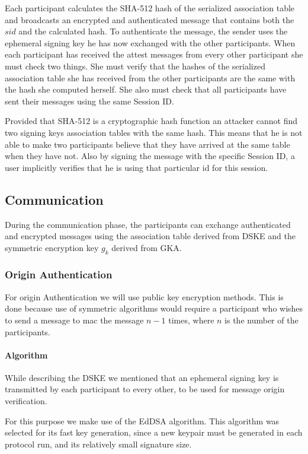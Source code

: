 Each participant calculates the SHA-512 hash of the serialized association table and broadcasts an encrypted and authenticated message that contains both the $sid$ and the calculated hash.
To authenticate the message, the sender uses the ephemeral signing key he has now exchanged with the other participants. When each participant has received the attest messages from every other participant she must check two things. She must verify that the hashes of the serialized association table she has received from the other participants are the same with the hash she computed herself. She also must check that all participants have sent their messages using the same Session ID.

Provided that SHA-512 is a cryptographic hash function an attacker cannot find two signing keys association tables with the same hash. This means that he is not able to make two participants believe that they have arrived at the same table when they have not. Also by signing the message with the specific Session ID, a user implicitly verifies that he is using that particular id for this session.

\subsection{Communication}
\label{subsections:Communication}
During the communication phase, the participants can exchange authenticated and encrypted messages using the association table derived from DSKE and the symmetric encryption key $g_k$ derived from GKA.

\subsubsection{Origin Authentication}
For origin Authentication we will use public key encryption methods. This is done because use of symmetric algorithms would require a participant who wishes to send a message to mac the message $n-1$ times, where $n$ is the number of the participants.

\paragraph{Algorithm}
While describing the DSKE we mentioned that an ephemeral signing key is transmitted by each participant to every other, to be used for message origin verification.

For this purpose we make use of the EdDSA algorithm. This algorithm was selected for its fast key generation, since a new keypair must be generated in each protocol run, and its relatively small signature size.

